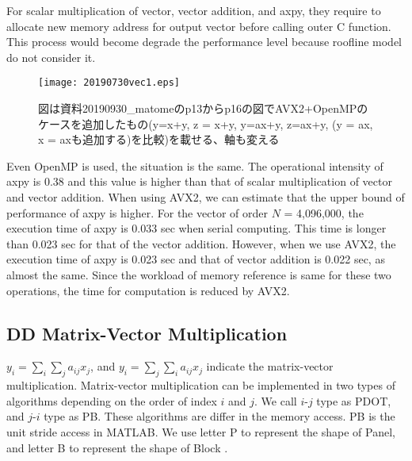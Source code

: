 \documentclass{IOS-Book-Article}
\begin{document}
For scalar multiplication of vector, vector addition, and axpy, they require to allocate new memory address for output vector before calling outer C function. This process would become degrade the performance level because roofline model do not consider it.
\begin{figure}[htbp]
  \begin{center}
    \texttt{[image: 20190730vec1.eps]}
    \caption{図は資料20190930\_matomeのp13からp16の図でAVX2+OpenMPのケースを追加したもの(y=x+y, z = x+y, y=ax+y, z=ax+y, (y = ax, x = axも追加する)を比較)を載せる、軸も変える}
    \label{xd}
  \end{center}
\end{figure}

Even OpenMP is used, the situation is the same. The operational intensity of axpy is 0.38 and this value is higher than that of scalar multiplication of vector and vector addition. When using AVX2, we can estimate that the upper bound of performance of axpy is higher. For the vector of order $N$ = 4,096,000, the execution time of axpy is 0.033 sec when serial computing. This time is longer than 0.023 sec for that of the vector addition. However, when we use AVX2, the execution time of axpy is 0.023 sec and that of vector addition is 0.022 sec, as almost the same. Since the workload of memory reference is same for these two operations, the time for computation is reduced by AVX2.



\subsection{DD Matrix-Vector Multiplication}
$y_{i} = \sum _i\sum _j a_{ij}x_{j}$, and $y_{i} = \sum _j\sum _i a_{ij}x_{j}$ 
indicate the matrix-vector multiplication. 
Matrix-vector multiplication can be implemented in 
two types of algorithms depending on the order of index $i$ and $j$. We call $i$-$j$ type as PDOT, and $j$-$i$ type as PB.
These algorithms are differ in the memory access. PB is the unit stride access in MATLAB.
We use letter P to represent the shape of Panel, and letter B to represent the shape of Block \cite{goto}. 
\end{document}
